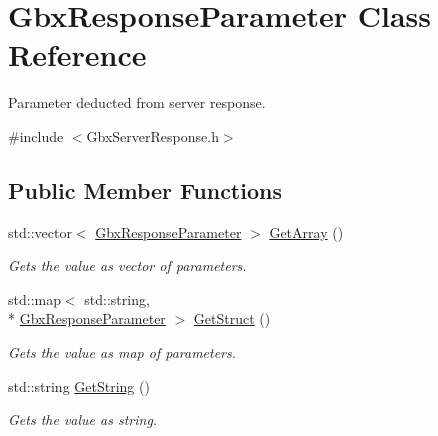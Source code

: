 \hypertarget{classGbxResponseParameter}{\section{Gbx\-Response\-Parameter Class Reference}
\label{classGbxResponseParameter}
}


Parameter deducted from server response.  




{\ttfamily \#include $<$Gbx\-Server\-Response.\-h$>$}

\subsection*{Public Member Functions}
\begin{DoxyCompactItemize}
\item 
\hypertarget{classGbxResponseParameter_aa27aca1d5084755fe585401617e2549a}{std\-::vector$<$ \hyperlink{classGbxResponseParameter}{Gbx\-Response\-Parameter} $>$ \hyperlink{classGbxResponseParameter_aa27aca1d5084755fe585401617e2549a}{Get\-Array} ()}\label{classGbxResponseParameter_aa27aca1d5084755fe585401617e2549a}

\begin{DoxyCompactList}\small\item\em Gets the value as vector of parameters. \end{DoxyCompactList}\item 
\hypertarget{classGbxResponseParameter_ab6af5e0662d7d832b7606e9e0f461f22}{std\-::map$<$ std\-::string, \\*
\hyperlink{classGbxResponseParameter}{Gbx\-Response\-Parameter} $>$ \hyperlink{classGbxResponseParameter_ab6af5e0662d7d832b7606e9e0f461f22}{Get\-Struct} ()}\label{classGbxResponseParameter_ab6af5e0662d7d832b7606e9e0f461f22}

\begin{DoxyCompactList}\small\item\em Gets the value as map of parameters. \end{DoxyCompactList}\item 
\hypertarget{classGbxResponseParameter_a014af0f74e937d9002cda3e6e791735b}{std\-::string \hyperlink{classGbxResponseParameter_a014af0f74e937d9002cda3e6e791735b}{Get\-String} ()}\label{classGbxResponseParameter_a014af0f74e937d9002cda3e6e791735b}

\begin{DoxyCompactList}\small\item\em Gets the value as string. \end{DoxyCompactList}\end{DoxyCompactItemize}
